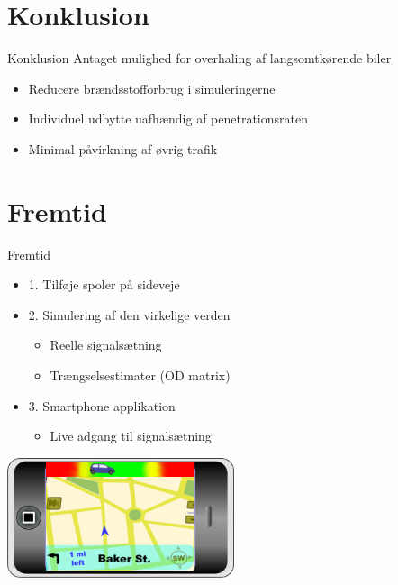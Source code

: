 \section{Konklusion}
\begin{frame}{Konklusion}
Antaget mulighed for overhaling af langsomtkørende biler
\begin{itemize}
\item Reducere brændsstofforbrug i simuleringerne
\item Individuel udbytte uafhændig af penetrationsraten
\item Minimal påvirkning af øvrig trafik
\end{itemize}
\end{frame}

\section{Fremtid}
\begin{frame}{Fremtid}
\begin{itemize}
\item 1. Tilføje spoler på sideveje
\item 2. Simulering af den virkelige verden %
	\begin{itemize}
	\item Reelle signalsætning
	\item Trængselsestimater (OD matrix)
	\end{itemize}
\item 3. Smartphone applikation
	\begin{itemize}
	\item Live adgang til signalsætning
	\end{itemize}
\end{itemize}

\begin{center}
\includegraphics[width=0.5\textwidth]{images/product.png}
\end{center}
\end{frame}
